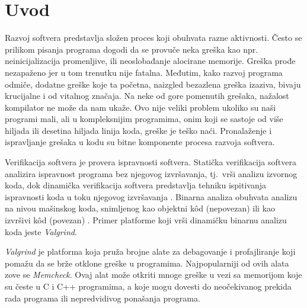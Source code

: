 \documentclass[12pt,oneside]{memoir}
\theoremstyle{plain}
\theoremstyle{definition}
\begin{document}
\frontmatter
\naslovna
\komisija
\apstrakt
\tableofcontents*

\mainmatter

\chapter{Uvod}
Razvoj softvera predstavlja složen proces koji obuhvata razne aktivnosti. Često se prilikom pisanja programa dogodi da se provuče neka greška kao npr. neinicijalizacija promenljive, ili neoslobađanje alocirane memorije. Greška prođe nezapaženo jer u tom trenutku nije fatalna. Međutim, kako razvoj programa odmiče, dodatne greške koje ta početna, naizgled bezazlena greška izaziva, bivaju krucijalne i od vitalnog značaja. Na neke od gore pomenutih grešaka, nažalost kompilator ne može da nam ukaže. Ovo nije veliki problem ukoliko su naši programi mali, ali u  kompleksnijim programima, onim koji se sastoje od više hiljada ili desetina hiljada linija koda, greške je teško naći. Pronalaženje i ispravljanje grešaka u kodu su bitne komponente procesa razvoja softvera.

Verifikacija softvera je provera ispravnosti softvera. Statička verifikacija softvera analizira ispravnost programa bez njegovog izvršavanja, tj.~vrši analizu izvornog koda, dok dinamička verifikacija softvera predstavlja tehniku ispitivanja ispravnosti koda u toku njegovog izvršavanja \cite{02Motivacija}. Binarna analiza obuhvata analizu na nivou mašinskog koda, snimljenog kao objektni k\^od (nepovezan) ili kao izvršivi k\^od (povezan) \cite{03DinamickaAnaliza}. Primer platforme koji vrši dinamičku binarnu analizu koda jeste \textit{Valgrind}.  

\textit{Valgrind} je platforma koja pruža brojne alate za debagovanje i profajliranje koji pomažu da se brže otklone greške u programima. Najpopularniji od ovih alata zove se \textit{Memcheck}. Ovaj alat može otkriti mnoge greške u vezi sa memorijom koje su česte u C i C++ programima, a koje mogu dovesti do neočekivanog prekida rada programa ili nepredvidivog ponašanja programa.
\end{document}
